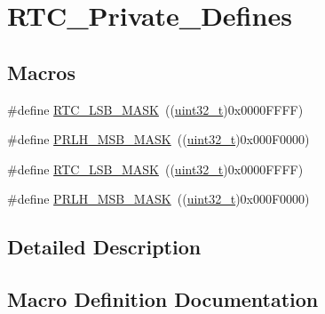 \hypertarget{group___r_t_c___private___defines}{}\section{R\+T\+C\+\_\+\+Private\+\_\+\+Defines}
\label{group___r_t_c___private___defines}
\subsection*{Macros}
\begin{DoxyCompactItemize}
\item 
\#define \hyperlink{group___r_t_c___private___defines_gae19d75bb0ecb5e93d97e026a04d4854f}{R\+T\+C\+\_\+\+L\+S\+B\+\_\+\+M\+A\+SK}~((\hyperlink{_p_e___types_8h_a33594304e786b158f3fb30289278f5af}{uint32\+\_\+t})0x0000\+F\+F\+F\+F)
\item 
\#define \hyperlink{group___r_t_c___private___defines_ga47b3eed8e018a9139bc7bb374c7ca125}{P\+R\+L\+H\+\_\+\+M\+S\+B\+\_\+\+M\+A\+SK}~((\hyperlink{_p_e___types_8h_a33594304e786b158f3fb30289278f5af}{uint32\+\_\+t})0x000\+F0000)
\item 
\#define \hyperlink{group___r_t_c___private___defines_gae19d75bb0ecb5e93d97e026a04d4854f}{R\+T\+C\+\_\+\+L\+S\+B\+\_\+\+M\+A\+SK}~((\hyperlink{_p_e___types_8h_a33594304e786b158f3fb30289278f5af}{uint32\+\_\+t})0x0000\+F\+F\+F\+F)
\item 
\#define \hyperlink{group___r_t_c___private___defines_ga47b3eed8e018a9139bc7bb374c7ca125}{P\+R\+L\+H\+\_\+\+M\+S\+B\+\_\+\+M\+A\+SK}~((\hyperlink{_p_e___types_8h_a33594304e786b158f3fb30289278f5af}{uint32\+\_\+t})0x000\+F0000)
\end{DoxyCompactItemize}


\subsection{Detailed Description}


\subsection{Macro Definition Documentation}
